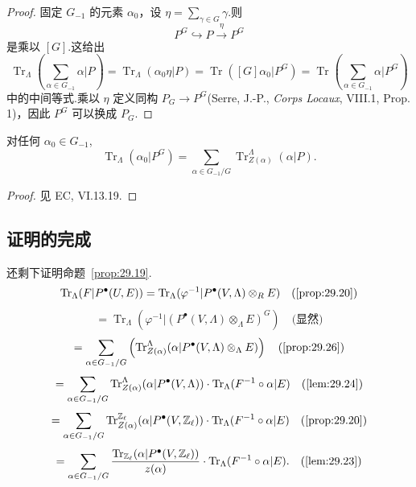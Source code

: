 \begin{proof}
固定 $G_{-1}$ 的元素 $\alpha_0$，设 $\eta = \sum_{\gamma \in G} \gamma$.则
\[
P^{G} \hookrightarrow P \xrightarrow{\eta} P^{G}
\]
是乘以 $[G]$.这给出
\[
\operatorname{Tr}_{\Lambda}\left( \sum_{\alpha \in G_{-1}} \alpha|P \right) = \operatorname{Tr}_{\Lambda}(\alpha_0\eta|P) = \operatorname{Tr}([G]\alpha_0|P^{G}) = \operatorname{Tr}\left( \sum_{\alpha \in G_{-1}} \alpha|P^{G} \right)
\]
中的中间等式.乘以 $\eta$ 定义同构 $P_{G} \to P^{G}$(Serre, J.-P., \emph{Corps Locaux}, VIII.1, Prop. 1)，因此 $P^{G}$ 可以换成 $P_{G}$.
\end{proof}

\begin{proposition}\label{prop:29.26}
对任何 $\alpha_0 \in G_{-1}$,
\[
\operatorname{Tr}_{\Lambda}(\alpha_0|P^{G}) = \sum_{\alpha \in G_{-1}/G} \operatorname{Tr}^{\Lambda}_{Z(\alpha)}(\alpha|P).
\]
\end{proposition}

\begin{proof}
见 EC, VI.13.19.
\end{proof}

\subsection*{证明的完成}

还剩下证明命题~\ref{prop:29.19}.
\[
\operatorname{Tr}_{\Lambda}(F|P^{\bullet}(U, E)) = \operatorname{Tr}_{\Lambda}(\varphi^{-1}|P^{\bullet}(V, \Lambda) \otimes_{R} E) \quad \text{(\ref{prop:29.20})}
\]
\[
= \operatorname{Tr}_{\Lambda}(\varphi^{-1}|(P^{\bullet}(V, \Lambda) \otimes_{\Lambda} E)^{G}) \quad \text{(显然)}
\]
\[
= \sum_{\alpha \in G_{-1}/G} \left( \operatorname{Tr}^{\Lambda}_{Z(\alpha)}(\alpha|P^{\bullet}(V, \Lambda) \otimes_{\Lambda} E) \right) \quad \text{(\ref{prop:29.26})}
\]
\[
= \sum_{\alpha \in G_{-1}/G} \operatorname{Tr}^{\Lambda}_{Z(\alpha)}(\alpha|P^{\bullet}(V, \Lambda)) \cdot \operatorname{Tr}_{\Lambda}(F^{-1} \circ \alpha|E) \quad \text{(\ref{lem:29.24})}
\]
\[
= \sum_{\alpha \in G_{-1}/G} \operatorname{Tr}^{\mathbb{Z}_{\ell}}_{Z(\alpha)}(\alpha|P^{\bullet}(V, \mathbb{Z}_{\ell})) \cdot \operatorname{Tr}_{\Lambda}(F^{-1} \circ \alpha|E) \quad \text{(\ref{prop:29.20})}
\]
\[
= \sum_{\alpha \in G_{-1}/G} \frac{\operatorname{Tr}_{\mathbb{Z}_{\ell}}(\alpha|P^{\bullet}(V, \mathbb{Z}_{\ell}))}{z(\alpha)} \cdot \operatorname{Tr}_{\Lambda}(F^{-1} \circ \alpha|E). \quad \text{(\ref{lem:29.23})}
\]
